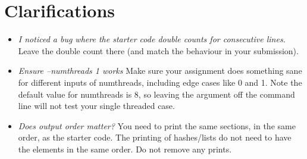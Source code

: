 \documentclass[12pt]{article}
\renewcommand{\_}{\kern-1.5pt\textunderscore\kern-1.5pt}
\begin{document}
\section*{Clarifications}

\begin{itemize}
  \item \emph{I noticed a bug where the starter code double counts for consecutive lines.} Leave the double count there (and match the behaviour in your submission).
  \item \emph{Ensure --num\_threads 1 works} Make sure your assignment does something sane for different inputs of num\_threads, including edge cases like 0 and 1. Note the default value for num\_threads is 8, so leaving the argument off the command line will not test your single threaded case.
  \item \emph{Does output order matter?} You need to print the same sections, in the same order, as the starter code. The printing of hashes/lists do not need to have the elements in the same order. Do not remove any prints.
\end{itemize}  



\end{document}
